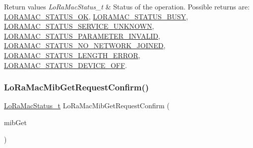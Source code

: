 \begin{DoxyRetVals}{Return values}
{\em Lo\+Ra\+Mac\+Status\+\_\+t} & Status of the operation. Possible returns are\+: \hyperlink{group__LORAMAC_gga1d18f26b344040b3ec5c3db662919661a03db5fca052313edb3823c014b653a74}{L\+O\+R\+A\+M\+A\+C\+\_\+\+S\+T\+A\+T\+U\+S\+\_\+\+OK}, \hyperlink{group__LORAMAC_gga1d18f26b344040b3ec5c3db662919661a66b12f569207eacd97ee1c1d6c4cee6d}{L\+O\+R\+A\+M\+A\+C\+\_\+\+S\+T\+A\+T\+U\+S\+\_\+\+B\+U\+SY}, \hyperlink{group__LORAMAC_gga1d18f26b344040b3ec5c3db662919661aff502a87db22d6a9a4919e4b54c7c1cf}{L\+O\+R\+A\+M\+A\+C\+\_\+\+S\+T\+A\+T\+U\+S\+\_\+\+S\+E\+R\+V\+I\+C\+E\+\_\+\+U\+N\+K\+N\+O\+WN}, \hyperlink{group__LORAMAC_gga1d18f26b344040b3ec5c3db662919661ad0d3119f247d00e1787dda106fcb3017}{L\+O\+R\+A\+M\+A\+C\+\_\+\+S\+T\+A\+T\+U\+S\+\_\+\+P\+A\+R\+A\+M\+E\+T\+E\+R\+\_\+\+I\+N\+V\+A\+L\+ID}, \hyperlink{group__LORAMAC_gga1d18f26b344040b3ec5c3db662919661a105228330376111d46d99d57688a20ae}{L\+O\+R\+A\+M\+A\+C\+\_\+\+S\+T\+A\+T\+U\+S\+\_\+\+N\+O\+\_\+\+N\+E\+T\+W\+O\+R\+K\+\_\+\+J\+O\+I\+N\+ED}, \hyperlink{group__LORAMAC_gga1d18f26b344040b3ec5c3db662919661a4ab40311dcd2eeffc77f573a919b29b1}{L\+O\+R\+A\+M\+A\+C\+\_\+\+S\+T\+A\+T\+U\+S\+\_\+\+L\+E\+N\+G\+T\+H\+\_\+\+E\+R\+R\+OR}, \hyperlink{group__LORAMAC_gga1d18f26b344040b3ec5c3db662919661aff1d3a91250809d1770a74776057b8ce}{L\+O\+R\+A\+M\+A\+C\+\_\+\+S\+T\+A\+T\+U\+S\+\_\+\+D\+E\+V\+I\+C\+E\+\_\+\+O\+FF}. \\
\hline
\end{DoxyRetVals}
\mbox{\label{group__LORAMAC_ga3e208a4f73213aa801eeb9d9da7b71dd}} 
\subsubsection{\texorpdfstring{Lo\+Ra\+Mac\+Mib\+Get\+Request\+Confirm()}{LoRaMacMibGetRequestConfirm()}}
{\footnotesize\ttfamily \hyperlink{group__LORAMAC_ga30bd25657e10480f8605ee951b0ecfbd}{Lo\+Ra\+Mac\+Status\+\_\+t} Lo\+Ra\+Mac\+Mib\+Get\+Request\+Confirm (\begin{DoxyParamCaption}\item[{\hyperlink{group__LORAMAC_ga9269d5ae88dd157a58e9d60f680d63f0}{Mib\+Request\+Confirm\+\_\+t} $\ast$}]{mib\+Get }\end{DoxyParamCaption})}




